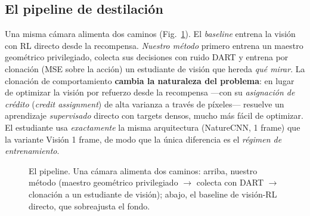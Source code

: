 \documentclass[conference]{IEEEtran}
\begin{document}
\subsection{El pipeline de destilaci\'on}
Una misma c\'amara alimenta dos caminos (Fig.~\ref{fig:pipeline}). El \emph{baseline} entrena
la visi\'on con RL directo desde la recompensa. \emph{Nuestro m\'etodo} primero entrena un
maestro geom\'etrico privilegiado, colecta sus decisiones con ruido DART y entrena por
clonaci\'on (MSE sobre la acci\'on) un estudiante de visi\'on que hereda \emph{qu\'e mirar}.
La clonaci\'on de comportamiento \textbf{cambia la naturaleza del problema}: en lugar de optimizar
la visi\'on por refuerzo desde la recompensa ---con su \emph{asignaci\'on de cr\'edito}
(\emph{credit assignment}) de alta varianza a trav\'es de p\'ixeles--- resuelve un aprendizaje
\emph{supervisado} directo con targets densos, mucho m\'as f\'acil de optimizar.
El estudiante usa \emph{exactamente} la misma arquitectura (NatureCNN, 1 frame) que la
variante Visi\'on 1 frame, de modo que la \'unica diferencia es el \emph{r\'egimen de
entrenamiento}.

\begin{figure}[H]
\centering
{}
\caption{El pipeline. Una c\'amara alimenta dos caminos: arriba, nuestro m\'etodo
(maestro geom\'etrico privilegiado $\rightarrow$ colecta con DART $\rightarrow$ clonaci\'on a
un estudiante de visi\'on); abajo, el baseline de visi\'on-RL directo, que sobreajusta el
fondo.}
\label{fig:pipeline}
\end{figure}
\end{document}
